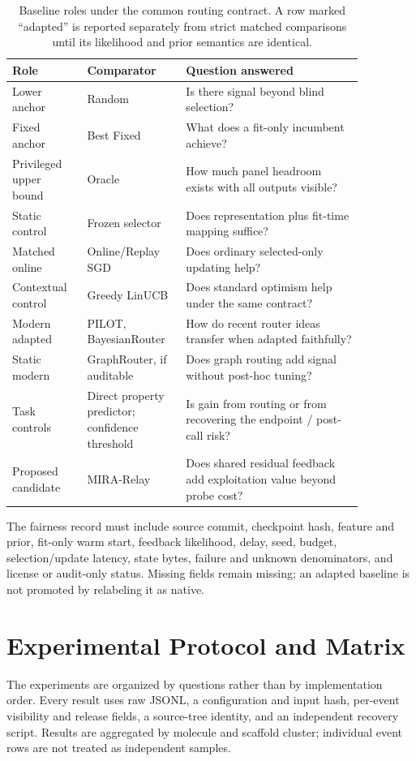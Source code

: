 \documentclass[sigconf,anonymous]{aamas}
\begin{document}
\begin{table}[t]
\caption{Baseline roles under the common routing contract. A row marked ``adapted'' is reported separately from strict matched comparisons until its likelihood and prior semantics are identical.}
\label{tab:baselines}
\small
\begin{tabular}{@{}P{0.19\linewidth}P{0.22\linewidth}P{0.45\linewidth}@{}}
\toprule
Role & Comparator & Question answered \\
\midrule
Lower anchor & Random & Is there signal beyond blind selection? \\
Fixed anchor & Best Fixed & What does a fit-only incumbent achieve? \\
Privileged upper bound & Oracle & How much panel headroom exists with all outputs visible? \\
Static control & Frozen selector & Does representation plus fit-time mapping suffice? \\
Matched online & Online/Replay SGD & Does ordinary selected-only updating help? \\
Contextual control & Greedy LinUCB & Does standard optimism help under the same contract? \\
Modern adapted & PILOT, BayesianRouter & How do recent router ideas transfer when adapted faithfully? \\
Static modern & GraphRouter, if auditable & Does graph routing add signal without post-hoc tuning? \\
Task controls & Direct property predictor; confidence threshold & Is gain from routing or from recovering the endpoint / post-call risk? \\
Proposed candidate & MIRA-Relay & Does shared residual feedback add exploitation value beyond probe cost? \\
\bottomrule
\end{tabular}
\end{table}

The fairness record must include source commit, checkpoint hash, feature and prior, fit-only warm start, feedback likelihood, delay, seed, budget, selection/update latency, state bytes, failure and unknown denominators, and license or audit-only status. Missing fields remain missing; an adapted baseline is not promoted by relabeling it as native.

\section{Experimental Protocol and Matrix}
The experiments are organized by questions rather than by implementation order. Every result uses raw JSONL, a configuration and input hash, per-event visibility and release fields, a source-tree identity, and an independent recovery script. Results are aggregated by molecule and scaffold cluster; individual event rows are not treated as independent samples.
\end{document}
